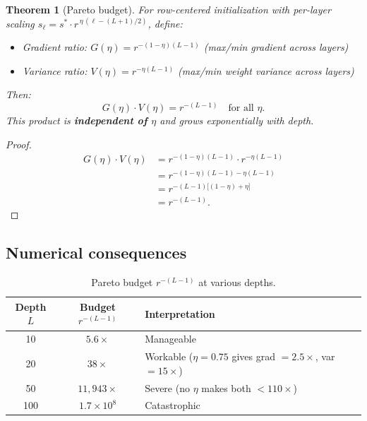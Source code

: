 \documentclass[11pt,a4paper]{article}
\newtheorem{theorem}{Theorem}[section]
\theoremstyle{definition}
\begin{document}
\begin{theorem}[Pareto budget]
  \label{thm:pareto}
  For row-centered initialization with per-layer scaling
  $s_\ell = s^{\ast} \cdot r^{\,\eta\,(\ell - (L+1)/2)}$, define:
  \begin{itemize}[nosep]
    \item Gradient ratio: $G(\eta) = r^{-(1-\eta)(L-1)}$
          \quad (max/min gradient across layers)
    \item Variance ratio: $V(\eta) = r^{-\eta(L-1)}$
          \quad (max/min weight variance across layers)
  \end{itemize}
  Then:
  \begin{equation}\label{eq:pareto}
    \boxed{\;G(\eta) \cdot V(\eta) = r^{-(L-1)} \quad\text{for all } \eta.\;}
  \end{equation}
  This product is \textbf{independent of $\eta$} and grows exponentially
  with depth.
\end{theorem}

\begin{proof}
  \begin{align*}
    G(\eta) \cdot V(\eta)
    &= r^{-(1-\eta)(L-1)} \cdot r^{-\eta(L-1)} \\
    &= r^{-(1-\eta)(L-1) - \eta(L-1)} \\
    &= r^{-(L-1)\bigl[(1-\eta) + \eta\bigr]} \\
    &= r^{-(L-1)}.
  \end{align*}
\end{proof}

\subsection{Numerical consequences}

\begin{table}[H]
\centering
\caption{Pareto budget $r^{-(L-1)}$ at various depths.}
\label{tab:budget}
\begin{tabular}{c c l}
\toprule
Depth $L$ & Budget $r^{-(L-1)}$ & Interpretation \\
\midrule
10  & $5.6\times$       & Manageable \\
20  & $38\times$         & Workable ($\eta = 0.75$ gives grad $= 2.5\times$, var $= 15\times$) \\
50  & $11{,}943\times$   & Severe (no $\eta$ makes both $< 110\times$) \\
100 & $1.7 \times 10^8$  & Catastrophic \\
\bottomrule
\end{tabular}
\end{table}
\end{document}
